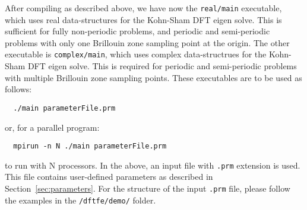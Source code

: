 After compiling \dftfe{} as described above, we have now the \verb|real/main| executable, which uses real data-structures for the Kohn-Sham DFT eigen solve. This is sufficient for fully non-periodic problems, and periodic and semi-periodic problems with only one Brillouin zone sampling point at the origin. The other executable is \verb|complex/main|, which uses complex data-structrues for the Kohn-Sham DFT eigen solve. This is required for periodic and semi-periodic problems with multiple Brillouin zone sampling points. These executables are to be used as follows:
\begin{verbatim}
  ./main parameterFile.prm
\end{verbatim}
or, for a parallel program:
\begin{verbatim}
  mpirun -n N ./main parameterFile.prm
\end{verbatim}
to run with N processors. In the above, an input file with \verb|.prm| extension is used. This file contains user-defined parameters as described in Section~\ref{sec:parameters}. For the structure of the input \verb|.prm| file, please follow the examples in the \verb|/dftfe/demo/| folder.
